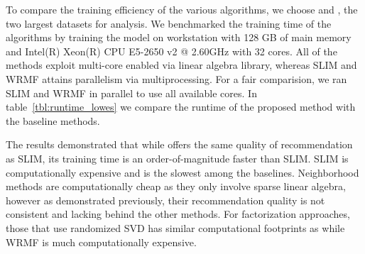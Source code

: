 To compare the training efficiency of the various algorithms, we choose \Lowes and \MLens, the two largest datasets for analysis.
We benchmarked the training time of the algorithms 
by training the model on  workstation with 128 GB of main memory and Intel(R) Xeon(R) CPU E5-2650 v2 @ 2.60GHz with 32 cores. All of the methods exploit multi-core enabled via linear algebra library, whereas SLIM and WRMF attains parallelism via multiprocessing. For a fair comparision, we ran  SLIM and WRMF in parallel to use all available cores.  In table~\ref{tbl:runtime_lowes} we compare the runtime of the proposed method with the baseline methods. 

The results demonstrated that while \LinearLow offers the same quality of recommendation as SLIM, its training time is an order-of-magnitude 
faster than SLIM.  SLIM is computationally expensive and is the slowest among the baselines. 
Neighborhood methods are computationally cheap as they only involve sparse linear algebra, however as demonstrated previously, their recommendation
quality is not consistent and lacking behind the other methods. 
For factorization approaches, those that use randomized SVD has similar computational footprints as \LinearLow while
WRMF is much computationally expensive.




\begin{table}
\caption{Training time on the  \Lowes  and \MLens Dataset.}
\label{tbl:runtime_lowes}
\centering
{}

\end{table}
